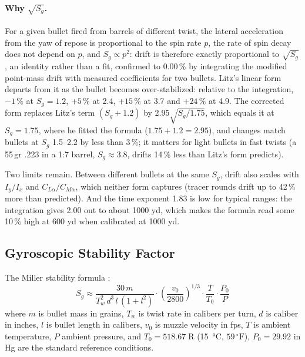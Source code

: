 \documentclass[11pt,twoside,openright]{report}
\newcommand{\degF}{\ensuremath{{}^{\circ}\mathrm{F}}}
\begin{document}
\paragraph{Why $\sqrt{S_g}$.} For a given bullet fired from barrels of different twist, the lateral acceleration from the yaw of repose is proportional to the spin rate $p$, the rate of spin decay does not depend on $p$, and $S_g \propto p^2$: drift is therefore exactly proportional to $\sqrt{S_g}$, an identity rather than a fit, confirmed to 0.00\,\% by integrating the modified point-mass drift with measured coefficients for two bullets. Litz's linear form departs from it as the bullet becomes over-stabilized: relative to the integration, $-1\,\%$ at $S_g = 1.2$, $+5\,\%$ at 2.4, $+15\,\%$ at 3.7 and $+24\,\%$ at 4.9. The corrected form replaces Litz's term $(S_g + 1.2)$ by $2.95\sqrt{S_g/1.75}$, which equals it at $S_g = 1.75$, where he fitted the formula ($1.75 + 1.2 = 2.95$), and changes match bullets at $S_g$ 1.5--2.2 by less than 3\,\%; it matters for light bullets in fast twists (a 55\,gr .223 in a 1:7 barrel, $S_g \approx 3.8$, drifts 14\,\% less than Litz's form predicts).

Two limits remain. Between different bullets at the same $S_g$, drift also scales with $I_y/I_x$ and $C_{L\alpha}/C_{M\alpha}$, which neither form captures (tracer rounds drift up to 42\,\% more than predicted). And the time exponent 1.83 is low for typical ranges: the integration gives 2.00 out to about 1000 yd, which makes the formula read some 10\,\% high at 600 yd when calibrated at 1000 yd.

\subsection{Gyroscopic Stability Factor}

The Miller stability formula \citep{miller2005twist}:
\begin{equation}
  \boxed{S_g \approx \frac{30\,m}{T_w^2\,d^3\,l\,\left(1 + l^2\right)} \cdot \left(\frac{v_0}{2800}\right)^{1/3} \cdot \frac{T}{T_0} \cdot \frac{P_0}{P}}
  \label{eq:miller_sg}
\end{equation}
where $m$ is bullet mass in grains, $T_w$ is twist rate in calibers per turn, $d$ is caliber in inches, $l$ is bullet length in calibers, $v_0$ is muzzle velocity in fps, $T$ is ambient temperature, $P$ ambient pressure, and $T_0 = 518.67\;\text{R}$ (\SI{15}{\celsius}, $59\,\degF$), $P_0 = 29.92$ in Hg are the standard reference conditions.
\end{document}
